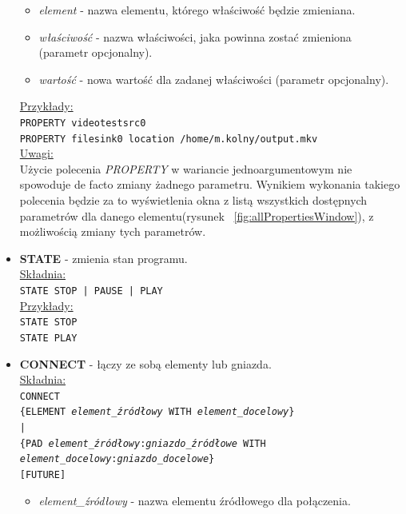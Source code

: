 \documentclass[12pt]{article}
\begin{document}
\begin{itemize}
\begin{itemize}
\item \textit{element} - nazwa elementu, którego właściwość będzie zmieniana.
\item \textit{właściwość} - nazwa właściwości, jaka powinna zostać zmieniona (parametr opcjonalny).
\item \textit{wartość} - nowa wartość dla zadanej właściwości (parametr opcjonalny). 
\end{itemize}
\underline{Przykłady:} \\
\texttt{PROPERTY videotestsrc0} \\
\texttt{PROPERTY filesink0 location /home/m.kolny/output.mkv} \\
\underline{Uwagi:} \\
Użycie polecenia \textit{PROPERTY} w wariancie jednoargumentowym nie spowoduje de facto zmiany żadnego parametru. Wynikiem wykonania takiego polecenia będzie za to wyświetlenia okna z listą wszystkich dostępnych parametrów dla danego elementu(rysunek ~\ref{fig:allPropertiesWindow}), z możliwością zmiany tych parametrów.
\item \textbf{STATE} - zmienia stan programu. \\
\underline{Składnia:} \\
\texttt{STATE STOP | PAUSE | PLAY} \\
\underline{Przykłady:} \\
\texttt{STATE STOP} \\
\texttt{STATE PLAY}
\item \textbf{CONNECT} - łączy ze sobą elementy lub gniazda. \\
\underline{Składnia:} \\
\texttt{CONNECT \\
\hspace*{2em} \{ELEMENT \textit{element\_źródłowy} WITH \textit{element\_docelowy}\} \\
\hspace*{2em} | \\
\hspace*{2em} \{PAD \textit{element\_źródłowy}:\textit{gniazdo\_źródłowe} WITH \\
\hspace*{4em} \textit{element\_docelowy}:\textit{gniazdo\_docelowe}\} \\
\hspace*{2em} [FUTURE]}
\begin{itemize}
\item \textit{element\_źródłowy} - nazwa elementu źródłowego dla połączenia.

\end{itemize}
\end{itemize}
\end{document}

